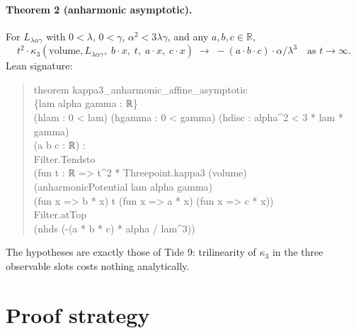 \documentclass[11pt]{article}
\begin{document}
\paragraph{Theorem 2 (anharmonic asymptotic).} For
$L_{\lambda\alpha\gamma}$ with $0 < \lambda$, $0 < \gamma$,
$\alpha^2 < 3\lambda\gamma$, and any $a, b, c \in \mathbb{R}$,
\[
  t^2 \cdot \kappa_3(\mathrm{volume}, L_{\lambda\alpha\gamma},\;
    b \cdot x,\; t,\; a \cdot x,\; c \cdot x)
  \;\to\; -(a \cdot b \cdot c) \cdot \alpha/\lambda^3
  \quad \text{as } t \to \infty.
\]
Lean signature:
\begin{quote}\small\ttfamily
theorem kappa3\_anharmonic\_affine\_asymptotic\\
\hspace*{1em}\{lam alpha gamma : ℝ\}\\
\hspace*{1em}(hlam : 0 < lam) (hgamma : 0 < gamma) (hdisc : alpha\^{}2 < 3 * lam * gamma)\\
\hspace*{1em}(a b c : ℝ) :\\
\hspace*{1em}Filter.Tendsto\\
\hspace*{2em}(fun t : ℝ => t\^{}2 * Threepoint.kappa3 (volume)\\
\hspace*{4em}(anharmonicPotential lam alpha gamma)\\
\hspace*{4em}(fun x => b * x) t (fun x => a * x) (fun x => c * x))\\
\hspace*{2em}Filter.atTop\\
\hspace*{2em}(nhds (-(a * b * c) * alpha / lam\^{}3))
\end{quote}
The hypotheses are exactly those of Tide 9: trilinearity of $\kappa_3$ in
the three observable slots costs nothing analytically.

\section{Proof strategy}
\end{document}
